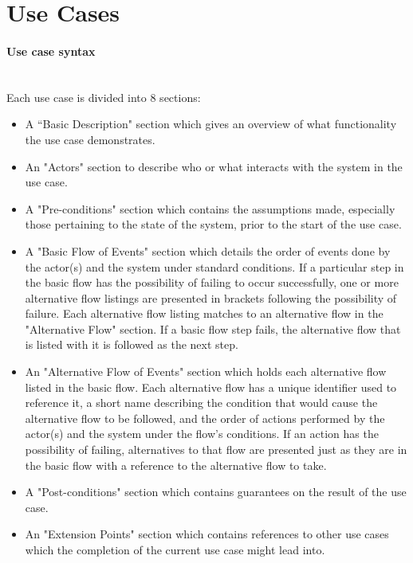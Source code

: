 \documentclass{article}
\begin{document}
\section{Use Cases}
\label{use_case}

\paragraph{Use case syntax}
~\\
Each use case is divided into 8 sections:
\begin{itemize}
\item A “Basic Description" section which gives an overview of what functionality the use case demonstrates.
\item An "Actors" section to describe who or what interacts with the system in the use case.
\item A "Pre-conditions" section which contains the assumptions made, especially those pertaining to the state of the system, prior to the start of the use case.\label{pre_cond}
\item A "Basic Flow of Events" section which details the order of events done by the actor(s) and the system under standard conditions. If a particular step in the basic flow has the possibility of failing to occur successfully, one or more alternative flow listings are presented in brackets following the possibility of failure. Each alternative flow listing matches to an alternative flow in the "Alternative Flow" section. If a basic flow step fails, the alternative flow that is listed with it is followed as the next step.
\item An "Alternative Flow of Events" section which holds each alternative flow listed in the basic flow. Each alternative flow has a unique identifier used to reference it, a short name describing the condition that would cause the alternative flow to be followed, and the order of actions performed by the actor(s) and the system under the flow's conditions. If an action has the possibility of failing, alternatives to that flow are presented just as they are in the basic flow with a reference to the alternative flow to take.
\item A "Post-conditions" section which contains guarantees on the result of the use case.\label{post_cond}
\item An "Extension Points" section which contains references to other use cases which the completion of the current use case might lead into.
\end{itemize}
\end{document}
